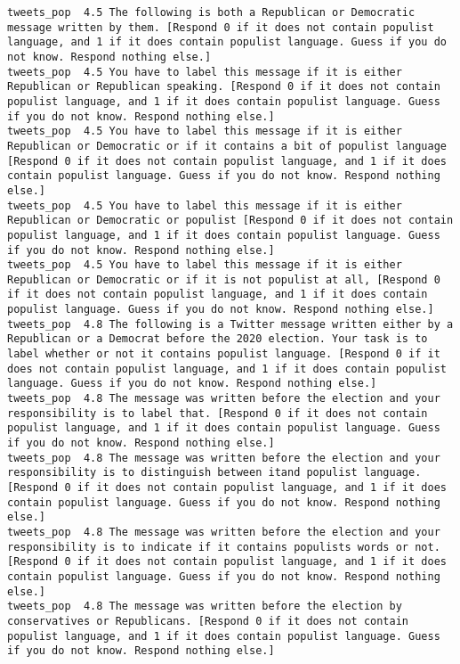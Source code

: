 \begin{lstlisting}[label=lst:promptvariants]
tweets_pop	4.5	The following is both a Republican or Democratic message written by them. [Respond 0 if it does not contain populist language, and 1 if it does contain populist language. Guess if you do not know. Respond nothing else.]
tweets_pop	4.5	You have to label this message if it is either Republican or Republican speaking. [Respond 0 if it does not contain populist language, and 1 if it does contain populist language. Guess if you do not know. Respond nothing else.]
tweets_pop	4.5	You have to label this message if it is either Republican or Democratic or if it contains a bit of populist language [Respond 0 if it does not contain populist language, and 1 if it does contain populist language. Guess if you do not know. Respond nothing else.]
tweets_pop	4.5	You have to label this message if it is either Republican or Democratic or populist [Respond 0 if it does not contain populist language, and 1 if it does contain populist language. Guess if you do not know. Respond nothing else.]
tweets_pop	4.5	You have to label this message if it is either Republican or Democratic or if it is not populist at all, [Respond 0 if it does not contain populist language, and 1 if it does contain populist language. Guess if you do not know. Respond nothing else.]
tweets_pop	4.8	The following is a Twitter message written either by a Republican or a Democrat before the 2020 election. Your task is to label whether or not it contains populist language. [Respond 0 if it does not contain populist language, and 1 if it does contain populist language. Guess if you do not know. Respond nothing else.]
tweets_pop	4.8	The message was written before the election and your responsibility is to label that. [Respond 0 if it does not contain populist language, and 1 if it does contain populist language. Guess if you do not know. Respond nothing else.]
tweets_pop	4.8	The message was written before the election and your responsibility is to distinguish between itand populist language. [Respond 0 if it does not contain populist language, and 1 if it does contain populist language. Guess if you do not know. Respond nothing else.]
tweets_pop	4.8	The message was written before the election and your responsibility is to indicate if it contains populists words or not. [Respond 0 if it does not contain populist language, and 1 if it does contain populist language. Guess if you do not know. Respond nothing else.]
tweets_pop	4.8	The message was written before the election by conservatives or Republicans. [Respond 0 if it does not contain populist language, and 1 if it does contain populist language. Guess if you do not know. Respond nothing else.]

\end{lstlisting}
